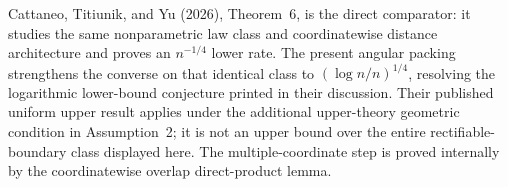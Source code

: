 Cattaneo, Titiunik, and Yu (2026), Theorem~6, is the direct comparator: it studies the same nonparametric law class and coordinatewise distance architecture and proves an \(n^{-1/4}\) lower rate.  The present angular packing strengthens the converse on that identical class to \((\log n/n)^{1/4}\), resolving the logarithmic lower-bound conjecture printed in their discussion.  Their published uniform upper result applies under the additional upper-theory geometric condition in Assumption~2; it is not an upper bound over the entire rectifiable-boundary class displayed here.  The multiple-coordinate step is proved internally by the coordinatewise overlap direct-product lemma.
